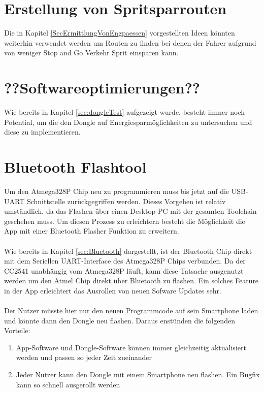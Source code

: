 \section{Erstellung von Spritsparrouten}
Die in Kapitel \ref{SecErmittlungVonEngpaessen} vorgestellten Ideen könnten weiterhin verwendet werden um Routen zu finden bei denen der Fahrer aufgrund von weniger Stop and Go Verkehr Sprit einsparen kann.

\section{??Softwareoptimierungen??}
Wie bereits in Kapitel \ref{sec:dongleTest} aufgezeigt wurde, besteht immer noch Potential, um die den Dongle auf Energiesparmöglichkeiten zu untersuchen und diese zu implementieren.

\section{Bluetooth Flashtool}
Um den Atmega328P Chip neu zu programmieren muss bis jetzt auf die USB-UART Schnittstelle zurückgegriffen werden. Dieses Vorgehen ist relativ umständlich, da das Flashen über einen Desktop-PC mit der gesamten Toolchain geschehen muss. Um diesen Prozess zu erleichtern besteht die Möglichkeit die App mit einer Bluetooth Flasher Funktion zu erweitern.
\paragraph{}
Wie bereits in Kapitel \ref{sec:Bluetooth} dargestellt, ist der Bluetooth Chip direkt mit dem Seriellen UART-Interface des Atmega328P Chips verbunden. Da der CC2541 unabhängig vom Atmega328P läuft, kann diese Tatsache ausgenutzt werden um den Atmel Chip direkt über Bluetooth zu flashen. Ein solches Feature in der App erleichtert das Ausrollen von neuen Sofware Updates sehr.
\paragraph{}
Der Nutzer müsste hier nur den neuen Programmcode auf sein Smartphone laden und könnte dann den Dongle neu flashen. 
Daraus enstünden die folgenden Vorteile: 
\begin{enumerate}
	\item App-Software und Dongle-Software können immer gleichzeitig aktualisiert werden und passen so jeder Zeit zueinander
	\item Jeder Nutzer kann den Dongle mit einem Smartphone neu flashen. Ein Bugfix kann so schnell ausgerollt werden 
\end{enumerate}
